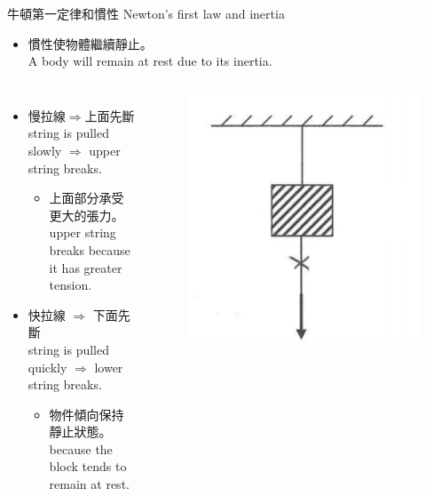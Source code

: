 \documentclass[beamer=true]{standalone}
\begin{document}
\begin{frame}{牛頓第一定律和慣性 Newton's first law and inertia}
    \begin{itemize}
        \item 慣性使物體繼續靜止。 \\A body will remain at rest due to its inertia.
    \end{itemize}
    \begin{columns}
        \begin{itemize}
            \item 慢拉線$\Rightarrow$上面先斷\\string is pulled slowly $\Rightarrow$ upper string breaks.
                  \begin{itemize}
                      \item 上面部分承受更大的張力。\\upper string breaks because it has greater tension.
                  \end{itemize}
            \item 快拉線 $\Rightarrow$ 下面先斷\\string is pulled quickly $\Rightarrow$ lower string breaks.
                  \begin{itemize}
                      \item 物件傾向保持靜止狀態。\\because the block tends to remain at rest.
                  \end{itemize}
        \end{itemize}
        \begin{figure}[h!]
            \centering
            \includegraphics[width=.8\textwidth]{assets/842a74ec.png}
        \end{figure}
    \end{columns}
\end{frame}
\end{document}

